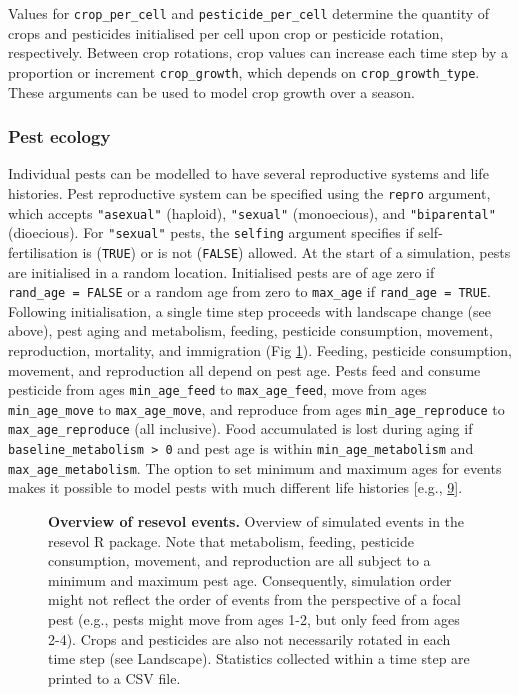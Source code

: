 \documentclass[10pt,letterpaper]{article}
\begin{document}
Values for \texttt{crop\_per\_cell} and \texttt{pesticide\_per\_cell} determine the quantity of crops and pesticides initialised per cell upon crop or pesticide rotation, respectively.
Between crop rotations, crop values can increase each time step by a proportion or increment \texttt{crop\_growth}, which depends on \texttt{crop\_growth\_type}.
These arguments can be used to model crop growth over a season.

\hypertarget{ecology}{%
\subsubsection{Pest ecology}\label{ecology}}

Individual pests can be modelled to have several reproductive systems and life histories.
Pest reproductive system can be specified using the \texttt{repro} argument, which accepts \texttt{"asexual"} (haploid), \texttt{"sexual"} (monoecious), and \texttt{"biparental"} (dioecious).
For \texttt{"sexual"} pests, the \texttt{selfing} argument specifies if self-fertilisation is (\texttt{TRUE}) or is not (\texttt{FALSE}) allowed.
At the start of a simulation, pests are initialised in a random location.
Initialised pests are of age zero if \texttt{rand\_age\ =\ FALSE} or a random age from zero to \texttt{max\_age} if \texttt{rand\_age\ =\ TRUE}.
Following initialisation, a single time step proceeds with landscape change (see above), pest aging and metabolism, feeding, pesticide consumption, movement, reproduction, mortality, and immigration (Fig \ref{fig:flowchart}).
Feeding, pesticide consumption, movement, and reproduction all depend on pest age.
Pests feed and consume pesticide from ages \texttt{min\_age\_feed} to \texttt{max\_age\_feed}, move from ages \texttt{min\_age\_move} to \texttt{max\_age\_move}, and reproduce from ages \texttt{min\_age\_reproduce} to \texttt{max\_age\_reproduce} (all inclusive).
Food accumulated is lost during aging if \texttt{baseline\_metabolism\ \textgreater{}\ 0} and pest age is within \texttt{min\_age\_metabolism} and \texttt{max\_age\_metabolism}.
The option to set minimum and maximum ages for events makes it possible to model pests with much different life histories {[}e.g., \protect\hyperlink{ref-Sudo2018}{9}{]}.

\begin{figure}[!h]
\caption{{\bf Overview of resevol events.}
Overview of simulated events in the resevol R package. Note that metabolism, feeding, pesticide consumption, movement, and reproduction are all subject to a minimum and maximum pest age. Consequently, simulation order might not reflect the order of events from the perspective of a focal pest (e.g., pests might move from ages 1-2, but only feed from ages 2-4). Crops and pesticides are also not necessarily rotated in each time step (see Landscape). Statistics collected within a time step are printed to a CSV file.}
\label{fig:flowchart}
\end{figure}
\end{document}
